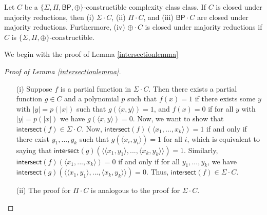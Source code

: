 \documentclass[11pt]{article}
\newcommand{\pr}{\text{Pr}}
\newcommand{\bp}{\textsf{BP}}
\newcommand{\strongbp}{\widehat{\textsf{BP}}}
\newcommand{\parity}{\oplus}
\newcommand{\intersect}{\textsf{intersect}}
\begin{document}
\begin{lemma}\label{amplifymainlemma}
Let $C$ be a \emph{$\{\Sigma,\Pi,\bp,\parity\}$}-constructible complexity class class. If $C$ is closed under majority reductions, then (i) \emph{$\Sigma \cdot C$}, (ii) \emph{$\Pi \cdot C$}, and (iii) \emph{$\bp \cdot C$} are closed under majority reductions. Furthermore, (iv) \emph{$\parity \cdot C$} is closed under majority reductions if $C$ is $\{\Sigma, \Pi, \parity\}$-constructible.
\end{lemma}
We begin with the proof of Lemma \ref{intersectionlemma}
\begin{proof}[Proof of Lemma \ref{intersectionlemma}]
\begin{enumerate}
\item[]
\item[(i)] Suppose $f$ is a partial function in $\Sigma\cdot C$. Then there exists a partial function $g\in C$ and a polynomial $p$ such that $f(x) = 1$ if there exists some $y$ with $|y| = p(|x|)$ such that $g(\langle x,y\rangle) = 1$, and $f(x) = 0$ if for all $y$ with $|y| = p(|x|)$ we have $g(\langle x, y\rangle) = 0$. Now, we want to show that $\intersect(f) \in \Sigma \cdot C$. Now, $\intersect(f)(\langle x_1,...,x_k\rangle) = 1$ if and only if there exist $y_1,...,y_k$ such that $g(\langle x_i, y_i\rangle) = 1$ for all $i$, which is equivalent to saying that $\intersect(g)(\langle \langle x_1,y_1\rangle,...,\langle x_k,y_k\rangle\rangle) = 1$. Similarly, $\intersect(f)(\langle x_1,...,x_k\rangle) = 0$ if and only if for all $y_1,...,y_k$, we have $\intersect(g)(\langle \langle x_1,y_1\rangle,...,\langle x_k,y_k\rangle\rangle) = 0$. Thus, $\intersect(f) \in \Sigma \cdot C$.


\item[(ii)] The proof for $\Pi \cdot C$ is analogous to the proof for $\Sigma \cdot C$.



\end{enumerate}
\end{proof}
\end{document}
